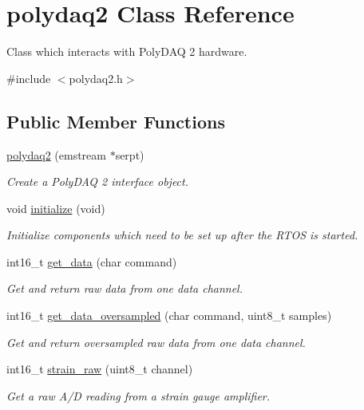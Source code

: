 \hypertarget{classpolydaq2}{\section{polydaq2 Class Reference}
\label{classpolydaq2}
}


Class which interacts with Poly\-D\-A\-Q 2 hardware.  




{\ttfamily \#include $<$polydaq2.\-h$>$}

\subsection*{Public Member Functions}
\begin{DoxyCompactItemize}
\item 
\hyperlink{classpolydaq2_ada78fa081faee4408043ed501b533805}{polydaq2} (emstream $\ast$serpt)
\begin{DoxyCompactList}\small\item\em Create a Poly\-D\-A\-Q 2 interface object. \end{DoxyCompactList}\item 
void \hyperlink{classpolydaq2_ae38297802b53115b68a219ee90a51397}{initialize} (void)
\begin{DoxyCompactList}\small\item\em Initialize components which need to be set up after the R\-T\-O\-S is started. \end{DoxyCompactList}\item 
int16\-\_\-t \hyperlink{classpolydaq2_ad2b04215b8b00e05595c14e74b6c203c}{get\-\_\-data} (char command)
\begin{DoxyCompactList}\small\item\em Get and return raw data from one data channel. \end{DoxyCompactList}\item 
int16\-\_\-t \hyperlink{classpolydaq2_ab2525448837ee98187b453c31b2bd266}{get\-\_\-data\-\_\-oversampled} (char command, uint8\-\_\-t samples)
\begin{DoxyCompactList}\small\item\em Get and return oversampled raw data from one data channel. \end{DoxyCompactList}\item 
int16\-\_\-t \hyperlink{classpolydaq2_a957565a13f1ac71238b0c13ba7b107f9}{strain\-\_\-raw} (uint8\-\_\-t channel)
\begin{DoxyCompactList}\small\item\em Get a raw A/\-D reading from a strain gauge amplifier. \end{DoxyCompactList}\item 

\end{DoxyCompactItemize}
